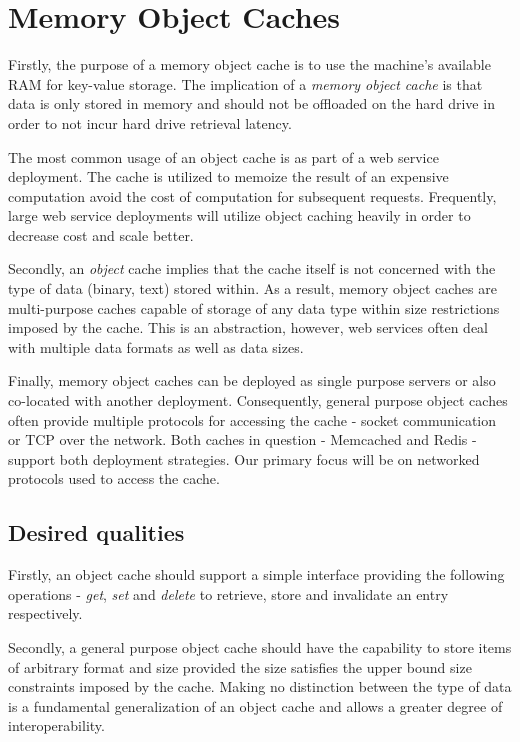 \section{Memory Object Caches}

Firstly, the purpose of a memory object cache is to use the machine's available RAM for key-value storage. The implication of a \textit{memory object cache} is that data is only stored in memory and should not be offloaded on the hard drive in order to not incur hard drive retrieval latency.

The most common usage of an object cache is as part of a web service deployment. The cache is utilized to memoize the result of an expensive computation avoid the cost of computation for subsequent requests. Frequently, large web service deployments will utilize object caching heavily in order to decrease cost and scale better.

Secondly, an \textit{object} cache implies that the cache itself is not concerned with the type of data (binary, text) stored within. As a result, memory object caches are multi-purpose caches capable of storage of any data type within size restrictions imposed by the cache. This is an abstraction, however, web services often deal with multiple data formats as well as data sizes.

Finally, memory object caches can be deployed as single purpose servers or also co-located with another deployment. Consequently, general purpose object caches often provide multiple protocols for accessing the cache - socket communication or TCP over the network. Both caches in question - Memcached and Redis - support both deployment strategies. Our primary focus will be on networked protocols used to access the cache.


\subsection{Desired qualities}
Firstly, an object cache should support a simple interface providing the following operations - \textit{get}, \textit{set} and \textit{delete} to retrieve, store and invalidate an entry respectively.

Secondly, a general purpose object cache should have the capability to store items of arbitrary format and size provided the size satisfies the upper bound size constraints imposed by the cache. Making no distinction between the type of data is a fundamental generalization of an object cache and allows a greater degree of interoperability.

